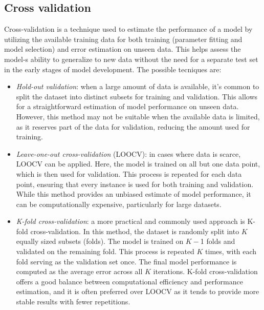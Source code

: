 \subsection{Cross validation}
Cross-validation is a technique used to estimate the performance of a model by utilizing the available training data for both training (parameter fitting and model selection) and error estimation on unseen data. 
This helps assess the model-s ability to generalize to new data without the need for a separate test set in the early stages of model development.
The possible tecniques are:
\begin{itemize}
    \item \textit{Hold-out validation}: when a large amount of data is available, it's common to split the dataset into distinct subsets for training and validation. 
        This allows for a straightforward estimation of model performance on unseen data. 
        However, this method may not be suitable when the available data is limited, as it reserves part of the data for validation, reducing the amount used for training.
    \item \textit{Leave-one-out cross-validation} (LOOCV): in cases where data is scarce, LOOCV can be applied. 
        Here, the model is trained on all but one data point, which is then used for validation. 
        This process is repeated for each data point, ensuring that every instance is used for both training and validation. 
        While this method provides an unbiased estimate of model performance, it can be computationally expensive, particularly for large datasets.
    \item \textit{K-fold cross-validation}: a more practical and commonly used approach is K-fold cross-validation. 
        In this method, the dataset is randomly split into $K$ equally sized subsets (folds). 
        The model is trained on $K-$1 folds and validated on the remaining fold. 
        This process is repeated $K$ times, with each fold serving as the validation set once. 
        The final model performance is computed as the average error across all $K$ iterations. 
        K-fold cross-validation offers a good balance between computational efficiency and performance estimation, and it is often preferred over LOOCV as it tends to provide more stable results with fewer repetitions.
\end{itemize}

